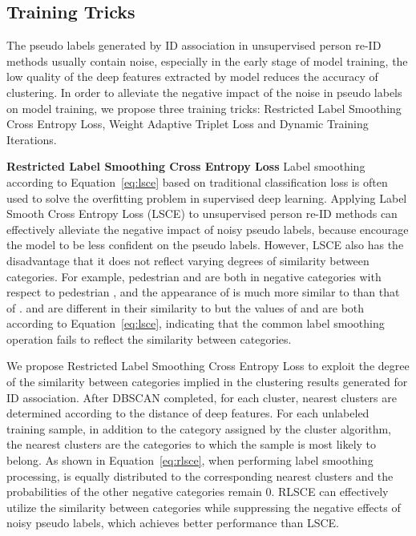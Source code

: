 \documentclass[10pt,twocolumn,letterpaper]{article}
\begin{document}
\subsection{Training Tricks}

The pseudo labels generated by ID association in unsupervised person re-ID methods usually contain noise, especially in the early stage of model training, the low quality of the deep features extracted by model reduces the accuracy of clustering. In order to alleviate the negative impact of the noise in pseudo labels on model training, we propose three training tricks: Restricted Label Smoothing Cross Entropy Loss, Weight Adaptive Triplet Loss and Dynamic Training Iterations.



\noindent \textbf{Restricted Label Smoothing Cross Entropy Loss}
Label smoothing according to Equation~\ref{eq:lsce} based on traditional classification loss is often used to solve the overfitting problem in supervised deep learning. Applying Label Smooth Cross Entropy Loss (LSCE) to unsupervised person re-ID methods can effectively alleviate the negative impact of noisy pseudo labels, because  encourage the model to be less confident on the pseudo labels. However, LSCE also has the disadvantage that it does not reflect varying degrees of similarity between categories. For example, pedestrian  and  are both in negative categories with respect to pedestrian , and the appearance of  is much more similar to  than that of .  and  are different in their similarity to  but the values of  and  are both  according to Equation~\ref{eq:lsce}, indicating that the common label smoothing operation fails to reflect the similarity between categories.

We propose Restricted Label Smoothing Cross Entropy Loss to exploit the degree of the similarity between categories implied in the clustering results generated for ID association. After DBSCAN completed, for each cluster,  nearest clusters are determined according to the distance of deep features. For each unlabeled training sample, in addition to the category assigned by the cluster algorithm, the  nearest clusters are the  categories to which the sample is most likely to belong. As shown in Equation~\ref{eq:rlsce}, when performing label smoothing processing,  is equally distributed to the corresponding  nearest clusters and the probabilities of the other negative categories remain 0. RLSCE can effectively utilize the similarity between categories while suppressing the negative effects of noisy pseudo labels, which achieves better performance than LSCE.
\end{document}
